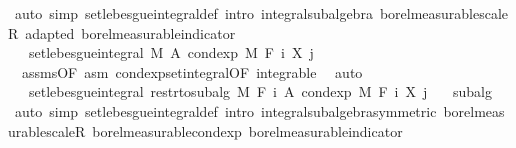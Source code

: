 \begin{isabellebody}
\ {\isacharparenleft}{\kern0pt}auto\ simp{\isacharcolon}{\kern0pt}\ set{\isacharunderscore}{\kern0pt}lebesgue{\isacharunderscore}{\kern0pt}integral{\isacharunderscore}{\kern0pt}def\ intro{\isacharcolon}{\kern0pt}\ integral{\isacharunderscore}{\kern0pt}subalgebra{}\ borel{\isacharunderscore}{\kern0pt}measurable{\isacharunderscore}{\kern0pt}scaleR\ adapted\ borel{\isacharunderscore}{\kern0pt}measurable{\isacharunderscore}{\kern0pt}indicator{\isacharparenright}{\kern0pt}\ \isanewline
\ \ \ \ \ \ \isamarkupfalse%
\ \isamarkupfalse%
\ {\isachardoublequoteopen}{\isachardot}{\kern0pt}{\isachardot}{\kern0pt}{\isachardot}{\kern0pt}\ {\isasymle}\ set{\isacharunderscore}{\kern0pt}lebesgue{\isacharunderscore}{\kern0pt}integral\ M\ A\ {\isacharparenleft}{\kern0pt}cond{\isacharunderscore}{\kern0pt}exp\ M\ {\isacharparenleft}{\kern0pt}F\ i{\isacharparenright}{\kern0pt}\ {\isacharparenleft}{\kern0pt}X\ j{\isacharparenright}{\kern0pt}{\isacharparenright}{\kern0pt}{\isachardoublequoteclose}\ \isamarkupfalse%
\ {\isacharasterisk}{\kern0pt}\ assms{\isacharparenleft}{\kern0pt}{}{\isacharparenright}{\kern0pt}{\isacharbrackleft}{\kern0pt}OF\ asm{\isacharbrackright}{\kern0pt}\ cond{\isacharunderscore}{\kern0pt}exp{\isacharunderscore}{\kern0pt}set{\isacharunderscore}{\kern0pt}integral{\isacharbrackleft}{\kern0pt}OF\ integrable{\isacharbrackright}{\kern0pt}\ \isamarkupfalse%
\ auto\isanewline
\ \ \ \ \ \ \isamarkupfalse%
\ \isamarkupfalse%
\ {\isachardoublequoteopen}{\isachardot}{\kern0pt}{\isachardot}{\kern0pt}{\isachardot}{\kern0pt}\ {\isacharequal}{\kern0pt}\ set{\isacharunderscore}{\kern0pt}lebesgue{\isacharunderscore}{\kern0pt}integral\ {\isacharparenleft}{\kern0pt}restr{\isacharunderscore}{\kern0pt}to{\isacharunderscore}{\kern0pt}subalg\ M\ {\isacharparenleft}{\kern0pt}F\ i{\isacharparenright}{\kern0pt}{\isacharparenright}{\kern0pt}\ A\ {\isacharparenleft}{\kern0pt}cond{\isacharunderscore}{\kern0pt}exp\ M\ {\isacharparenleft}{\kern0pt}F\ i{\isacharparenright}{\kern0pt}\ {\isacharparenleft}{\kern0pt}X\ j{\isacharparenright}{\kern0pt}{\isacharparenright}{\kern0pt}{\isachardoublequoteclose}\ \isamarkupfalse%
\ {\isacharasterisk}{\kern0pt}\ subalg\ \isamarkupfalse%
\ {\isacharparenleft}{\kern0pt}auto\ simp{\isacharcolon}{\kern0pt}\ set{\isacharunderscore}{\kern0pt}lebesgue{\isacharunderscore}{\kern0pt}integral{\isacharunderscore}{\kern0pt}def\ intro{\isacharbang}{\kern0pt}{\isacharcolon}{\kern0pt}\ integral{\isacharunderscore}{\kern0pt}subalgebra{}{\isacharbrackleft}{\kern0pt}symmetric{\isacharbrackright}{\kern0pt}\ borel{\isacharunderscore}{\kern0pt}measurable{\isacharunderscore}{\kern0pt}scaleR\ borel{\isacharunderscore}{\kern0pt}measurable{\isacharunderscore}{\kern0pt}cond{\isacharunderscore}{\kern0pt}exp\ borel{\isacharunderscore}{\kern0pt}measurable{\isacharunderscore}{\kern0pt}indicator{\isacharparenright}{\kern0pt}\isanewline

\end{isabellebody}

